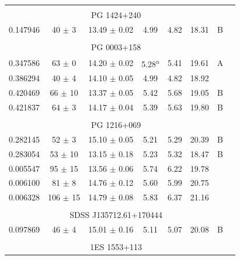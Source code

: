 \begin{longtable}{cccccccc}
            \hline \tabularnewline

            \multicolumn{7}{c}{PG 1424+240} \\ \hline 

            0.147946  &  40 $\pm$ 3  &  13.49 $\pm$ 0.02  &  4.99  &  4.82  &  18.31  &  B \\

            \hline \tabularnewline

            \multicolumn{7}{c}{PG 0003+158} \\ \hline 

            0.347586  &  63 $\pm$ 0  &  14.20 $\pm$ 0.02  &  5.28\textsuperscript{a}  &  5.41  &  19.61  &  A \\
            0.386294  &  40 $\pm$ 4  &  14.10 $\pm$ 0.05  &  4.99  &  4.82  &  18.92  &   \\
            0.420469  &  66 $\pm$ 10  &  13.37 $\pm$ 0.05  &  5.42  &  5.68  &  19.05  & B  \\
            0.421837  &  64 $\pm$ 3  &  14.17 $\pm$ 0.04  &  5.39  &  5.63  &  19.80  & B  \\

            \hline \tabularnewline

            \multicolumn{7}{c}{PG 1216+069} \\ \hline 

            0.282145  &  52 $\pm$ 3  &  15.10 $\pm$ 0.05  &  5.21  &  5.29  &  20.39  &  B \\
            0.283054  &  53 $\pm$ 10  &  13.15 $\pm$ 0.18  &  5.23  &  5.32  &  18.47  &  B \\
            0.005547  &  95 $\pm$ 15  &  13.56 $\pm$ 0.06  &  5.74  &  6.22  &  19.78  &   \\
            0.006100  &  81 $\pm$ 8  &  14.76 $\pm$ 0.12  &  5.60  &  5.99  &  20.75  &   \\
            0.006328  &  106 $\pm$ 15  &  14.79 $\pm$ 0.08  &  5.83  &  6.37  &  21.16  &   \\

            \hline \tabularnewline

            \multicolumn{7}{c}{SDSS J135712.61+170444} \\ \hline 

            0.097869  &  46 $\pm$ 4  &  15.01 $\pm$ 0.16  &  5.11  &  5.07  &  20.08  &  B \\

            \hline \tabularnewline

            \multicolumn{7}{c}{1ES 1553+113} \\ \hline 


\end{longtable}
